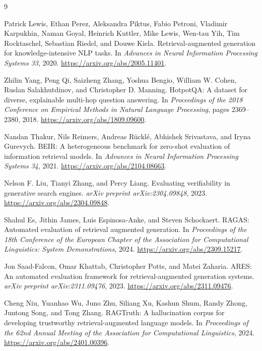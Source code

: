 \documentclass[10pt,twocolumn]{article}
\begin{document}
\begin{thebibliography}{9}

Patrick Lewis, Ethan Perez, Aleksandra Piktus, Fabio Petroni, Vladimir Karpukhin,
Naman Goyal, Heinrich Kuttler, Mike Lewis, Wen-tau Yih, Tim Rocktaschel,
Sebastian Riedel, and Douwe Kiela.
\newblock Retrieval-augmented generation for knowledge-intensive NLP tasks.
\newblock In \emph{Advances in Neural Information Processing Systems 33}, 2020.
\newblock \url{https://arxiv.org/abs/2005.11401}.

Zhilin Yang, Peng Qi, Saizheng Zhang, Yoshua Bengio, William W. Cohen,
Ruslan Salakhutdinov, and Christopher D. Manning.
\newblock HotpotQA: A dataset for diverse, explainable multi-hop question answering.
\newblock In \emph{Proceedings of the 2018 Conference on Empirical Methods in Natural Language Processing}, pages 2369--2380, 2018.
\newblock \url{https://arxiv.org/abs/1809.09600}.

Nandan Thakur, Nils Reimers, Andreas R{\"u}ckl{\'e}, Abhishek Srivastava, and Iryna Gurevych.
\newblock BEIR: A heterogeneous benchmark for zero-shot evaluation of information retrieval models.
\newblock In \emph{Advances in Neural Information Processing Systems 34}, 2021.
\newblock \url{https://arxiv.org/abs/2104.08663}.

Nelson F. Liu, Tianyi Zhang, and Percy Liang.
\newblock Evaluating verifiability in generative search engines.
\newblock \emph{arXiv preprint arXiv:2304.09848}, 2023.
\newblock \url{https://arxiv.org/abs/2304.09848}.

Shahul Es, Jithin James, Luis Espinosa-Anke, and Steven Schockaert.
\newblock RAGAS: Automated evaluation of retrieval augmented generation.
\newblock In \emph{Proceedings of the 18th Conference of the European Chapter of the Association for Computational Linguistics: System Demonstrations}, 2024.
\newblock \url{https://arxiv.org/abs/2309.15217}.

Jon Saad-Falcon, Omar Khattab, Christopher Potts, and Matei Zaharia.
\newblock ARES: An automated evaluation framework for retrieval-augmented generation systems.
\newblock \emph{arXiv preprint arXiv:2311.09476}, 2023.
\newblock \url{https://arxiv.org/abs/2311.09476}.

Cheng Niu, Yuanhao Wu, Juno Zhu, Siliang Xu, Kashun Shum, Randy Zhong, Juntong Song, and Tong Zhang.
\newblock RAGTruth: A hallucination corpus for developing trustworthy retrieval-augmented language models.
\newblock In \emph{Proceedings of the 62nd Annual Meeting of the Association for Computational Linguistics}, 2024.
\newblock \url{https://arxiv.org/abs/2401.00396}.

\end{thebibliography}
\end{document}
